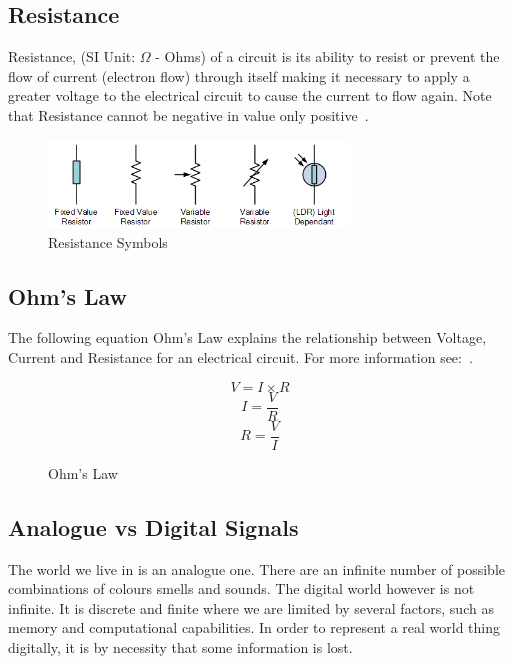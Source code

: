 \newpage
\subsection*{Resistance}
Resistance, (SI Unit: $\Omega$ - Ohms) of a circuit is its ability to resist or prevent the flow of current (electron flow) through itself making it necessary to apply a greater voltage to the electrical circuit to cause the current to flow again. Note that Resistance cannot be negative in value only positive~\citep{et-15}.

%
\begin{figure}[ht]
	\centering
	\includegraphics[width=8cm]{images/04}
	\caption{Resistance Symbols \citep{et-15}}
	\label{fig:resistance_symbols}
\end{figure}
%

\subsection*{Ohm's Law}
The following equation Ohm's Law explains the relationship between Voltage, Current and Resistance for an electrical circuit. For more information see:~\citep{et-14}.

%
\begin{figure}[ht]
	\centering
	\begin{equation}
	V = I \times R
	\end{equation}
	\begin{equation}
	I = \frac{V}{R}
	\end{equation}
	\begin{equation}
	R = \frac{V}{I} 
	\end{equation}
	\caption{Ohm's Law}
	\label{fig:ohms_law_equation}
\end{figure}
%


\subsection*{Analogue vs Digital Signals}

The world we live in is an analogue one. There are an infinite number of possible combinations of colours smells and sounds. The digital world however is not infinite. It is discrete and finite where we are limited by several factors, such as memory and computational capabilities. In order to represent a real world thing digitally, it is by necessity that some information is lost.

